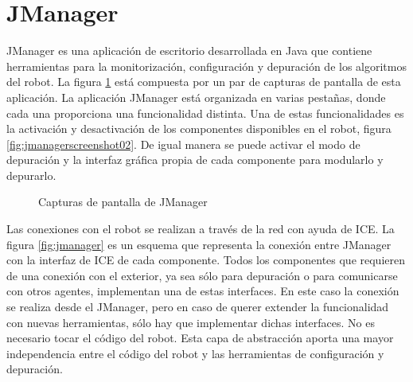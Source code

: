 \section{JManager}
\label{sec:jmanager}

JManager es una aplicación de escritorio desarrollada en Java que contiene herramientas para la monitorización, configuración y depuración de los algoritmos del robot. La figura \ref{fig:jmanagerscreenshot} está compuesta por un par de capturas de pantalla de esta aplicación. La aplicación JManager está organizada en varias pestañas, donde cada una proporciona una funcionalidad distinta. Una de estas funcionalidades es la activación y desactivación de los componentes disponibles en el robot, figura \ref{fig:jmanagerscreenshot02}. De igual manera se puede activar el modo de depuración y la interfaz gráfica propia de cada componente para modularlo y depurarlo. \\

\begin{figure}[h]
  \centering
  \caption{Capturas de pantalla de JManager}
  \label{fig:jmanagerscreenshot}
\end{figure}

Las conexiones con el robot se realizan a través de la red con ayuda de ICE. La figura \ref{fig:jmanager} es un esquema que representa la conexión entre JManager con la interfaz de ICE de cada componente. Todos los componentes que requieren de una conexión con el exterior, ya sea sólo para depuración o para comunicarse con otros agentes, implementan una de estas interfaces. En este caso la conexión se realiza desde el JManager, pero en caso de querer extender la funcionalidad con nuevas herramientas, sólo hay que implementar dichas interfaces. No es necesario tocar el código del robot. Esta capa de abstracción aporta una mayor independencia entre el código del robot y las herramientas de configuración y depuración.

